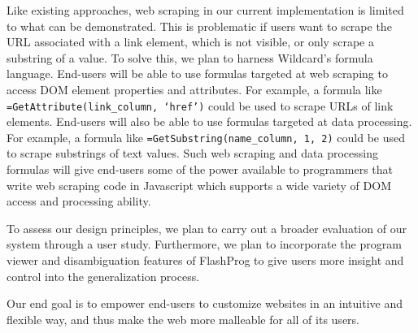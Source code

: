 \documentclass[sigconf,10pt]{acmart}
\begin{document}
Like existing approaches, web scraping in our current implementation is
limited to what can be demonstrated. This is problematic if users want
to scrape the URL associated with a link element, which is not visible,
or only scrape a substring of a value. To solve this, we plan to harness
Wildcard's formula language. End-users will be able to use formulas
targeted at web scraping to access DOM element properties and
attributes. For example, a formula like
\texttt{=GetAttribute(link\_column,\ ‘href’)} could be used to scrape
URLs of link elements. End-users will also be able to use formulas
targeted at data processing. For example, a formula like
\texttt{=GetSubstring(name\_column,\ 1,\ 2)} could be used to scrape
substrings of text values. Such web scraping and data processing
formulas will give end-users some of the power available to programmers
that write web scraping code in Javascript which supports a wide variety
of DOM access and processing ability.

To assess our design principles, we plan to carry out a broader
evaluation of our system through a user study. Furthermore, we plan to
incorporate the program viewer and disambiguation features of FlashProg
\citep{mayer2015} to give users more insight and control into the
generalization process.

Our end goal is to empower end-users to customize websites in an
intuitive and flexible way, and thus make the web more malleable for all
of its users.




\end{document}
